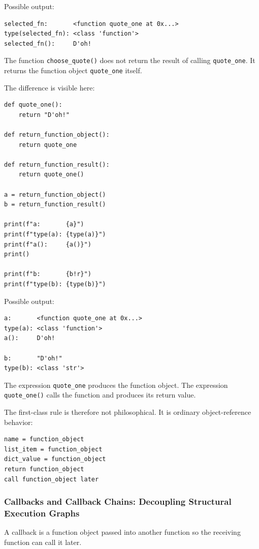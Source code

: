 Possible output:

\begin{verbatim}
selected_fn:       <function quote_one at 0x...>
type(selected_fn): <class 'function'>
selected_fn():     D'oh!
\end{verbatim}

The function \texttt{choose\_quote()} does not return the result of calling \texttt{quote\_one}. It returns the function object \texttt{quote\_one} itself.

The difference is visible here:

\begin{verbatim}
def quote_one():
    return "D'oh!"

def return_function_object():
    return quote_one

def return_function_result():
    return quote_one()

a = return_function_object()
b = return_function_result()

print(f"a:       {a}")
print(f"type(a): {type(a)}")
print(f"a():     {a()}")
print()

print(f"b:       {b!r}")
print(f"type(b): {type(b)}")
\end{verbatim}

Possible output:

\begin{verbatim}
a:       <function quote_one at 0x...>
type(a): <class 'function'>
a():     D'oh!

b:       "D'oh!"
type(b): <class 'str'>
\end{verbatim}

The expression \texttt{quote\_one} produces the function object. The expression \texttt{quote\_one()} calls the function and produces its return value.

The first-class rule is therefore not philosophical. It is ordinary object-reference behavior:

\begin{verbatim}
name = function_object
list_item = function_object
dict_value = function_object
return function_object
call function_object later
\end{verbatim}

\subsubsection{Callbacks and Callback Chains: Decoupling Structural Execution Graphs}

A callback is a function object passed into another function so the receiving function can call it later.

